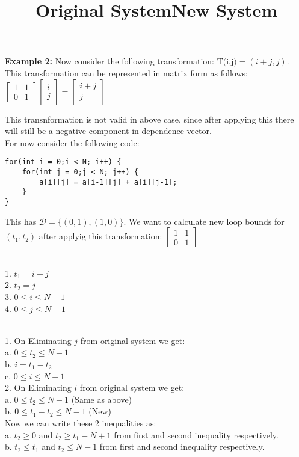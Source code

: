 \documentclass{article}
\begin{document}
\textbf{Example 2:}
Now consider the following transformation: $\text{T(i,j)} = (i+j,j)$. This transformation can be represented in matrix form as follows:
$\begin{bmatrix}
    1 & 1 \\
    0 & 1
\end{bmatrix} \begin{bmatrix}
    i \\ j
\end{bmatrix} = \begin{bmatrix}
    i+j \\ j
\end{bmatrix}$

This transnformation is not valid in above case, since after applying this there will still be a negative component in dependence vector. \\
For now consider the following code:
\begin{lstlisting}
for(int i = 0;i < N; i++) {
    for(int j = 0;j < N; j++) {
        a[i][j] = a[i-1][j] + a[i][j-1];
    }
}
\end{lstlisting}

This has $\mathcal{D} = \{(0,1),(1,0)\}$. We want to calculate new loop bounds for $(t_1,t_2)$ after applyig this transformation: $\begin{bmatrix}
    1 & 1 \\
    0 & 1
\end{bmatrix}$

\title{Original System} \\
1. $t_1 = i+j$ \\
2. $t_2 = j$ \\
3. $0 \leq i \leq N-1$ \\
4. $0 \leq j \leq N-1$ \\

\title{New System} \\
1. On Eliminating $j$ from original system we get: \\
a. $0 \leq t_2 \leq N-1$ \\
b. $i = t_1 - t_2$ \\
c. $0 \leq i \leq N-1$ \\

2. On Eliminating $i$ from original system we get: \\
a. $0 \leq t_2 \leq N-1$ (Same as above) \\
b. $0 \leq t_1 - t_2 \leq N-1$ (New) \\

Now we can write these 2 inequalities as: \\
a. $t_2 \geq 0$ and $t_2 \geq t_1 - N + 1$ from first and second inequality respectively. \\
b. $t_2 \leq t_1$ and $t_2 \leq N-1$ from first and second inequality respectively. \\
\end{document}
